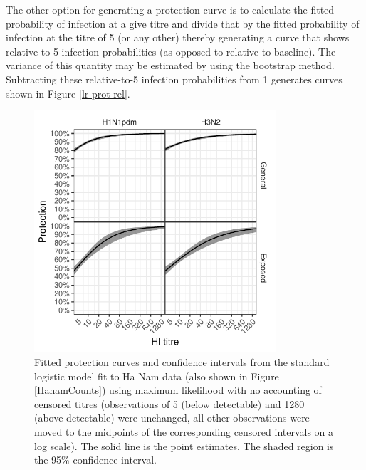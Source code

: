 The other option for generating a protection curve is to calculate the fitted probability of infection at a give titre and divide that by the fitted probability of infection at the titre of 5 (or any other) thereby generating a curve that shows relative-to-5 infection probabilities (as opposed to relative-to-baseline). The variance of this quantity may be estimated by using the bootstrap method. Subtracting these relative-to-5 infection probabilities from 1 generates curves shown in Figure \ref{lr-prot-rel}.

\begin{figure}[htp]
	\centering
	\includegraphics[width=0.8\textwidth]{../fit-logistic-plot/hanam-hi-prot.pdf}
	\caption{
	Fitted protection curves and confidence intervals from the standard logistic model fit to Ha Nam data (also shown in Figure \ref{HanamCounts}) using maximum likelihood with no accounting of censored titres (observations of 5 (below detectable) and 1280 (above detectable) were unchanged, all other observations were moved to the midpoints of the corresponding censored intervals on a log scale). The solid line is the point estimates. The shaded region is the 95\% confidence interval.
	}
	\label{lr-prot-abs}
\end{figure}

